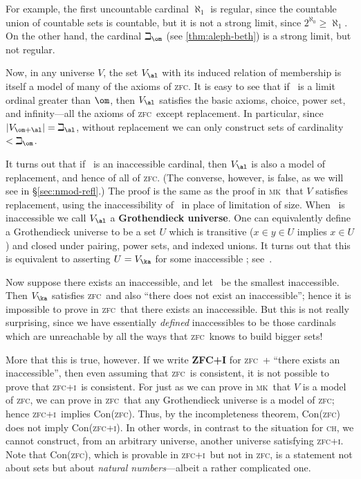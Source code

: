 \documentclass[12pt]{amsart}
\def\zfc{\textsc{zfc}}
\def\zfci{\textsc{zfc+i}}
\def\mk{\textsc{mk}}
\def\ch{\textsc{ch}}
\begin{document}
For example, the first uncountable cardinal $\aleph_1$ is regular,
since the countable union of countable sets is countable, but it is
not a strong limit, since $2^{\aleph_0} \ge \aleph_1$.  On the other
hand, the cardinal $\beth_\om$ (see \autoref{thm:aleph-beth}) is a
strong limit, but not regular.


Now, in any universe $V$, the set $V_\al$ with its induced relation of
membership is itself a model of many of the axioms of \zfc.  It is
easy to see that if \al\ is a limit ordinal greater than $\om$, then
$V_\al$ satisfies the basic axioms, choice, power set, and
infinity---all the axioms of \zfc\ except replacement.  In particular,
since $|V_{\om+\al}| = \beth_{\al}$, without replacement we can only
construct sets of cardinality $<\beth_\om$.

It turns out that if \al\ is an inaccessible cardinal, then $V_\al$ is
also a model of replacement, and hence of all of \zfc.  (The converse,
however, is false, as we will see in \S\ref{sec:nmod-refl}.)  The
proof is the same as the proof in \mk\ that $V$ satisfies replacement,
using the inaccessibility of \al\ in place of limitation of size.
When \al\ is inaccessible we call $V_\al$ a \textbf{Grothendieck
  universe}.  One can equivalently define a Grothendieck universe to
be a set $U$ which is transitive ($x\in y\in U$ implies $x\in U$) and
closed under pairing, power sets, and indexed unions.  It turns out
that this is equivalent to asserting $U=V_\ka$ for some inaccessible
\ka; see~\cite{bourbaki:universe}.

Now suppose there exists an inaccessible, and let \ka\ be the smallest
inaccessible.  Then $V_\ka$ satisfies \zfc\ and also ``there does not
exist an inaccessible''; hence it is impossible to prove in \zfc\ that
there exists an inaccessible.  But this is not really surprising,
since we have essentially \emph{defined} inaccessibles to be those
cardinals which are unreachable by all the ways that \zfc\ knows to
build bigger sets!

More that this is true, however.  If we write \textbf{ZFC+I} for \zfc\
+ ``there exists an inaccessible'', then even assuming that \zfc\ is
consistent, it is not possible to prove that \zfci\ is consistent.
For just as we can prove in \mk\ that $V$ is a model of \zfc, we can
prove in \zfc\ that any Grothendieck universe is a model of \zfc;
hence \zfci\ implies Con(\zfc).  Thus, by the incompleteness theorem,
Con(\zfc) does not imply Con(\zfci).  In other words, in contrast to
the situation for \ch, we cannot construct, from an arbitrary
universe, another universe satisfying \zfci.  Note that Con(\zfc),
which is provable in \zfci\ but not in \zfc, is a statement not about
sets but about \emph{natural numbers}---albeit a rather complicated
one.
\end{document}
